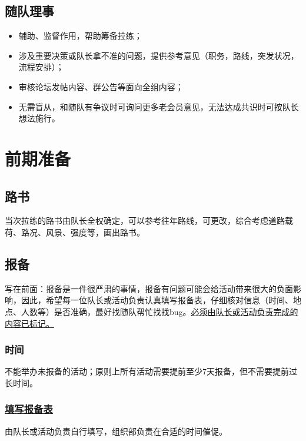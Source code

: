 \documentclass[UTF8]{ctexart}
\begin{document}
\subsection{随队理事}

\begin{itemize}[nosep,left=2em]
    \item 辅助、监督作用，帮助筹备拉练；
    \item 涉及重要决策或队长拿不准的问题，提供参考意见（职务，路线，突发状况，流程安排）；
    \item 审核论坛发帖内容、群公告等面向全组内容；
    \item 无需盲从，和随队有争议时可询问更多老会员意见，无法达成共识时可按队长想法施行。
    
\end{itemize}

\section{前期准备}

\subsection{路书}

当次拉练的路书由队长全权确定，可以参考往年路线，可更改，综合考虑道路载荷、路况、风景、强度等，画出路书。

\subsection{报备}

写在前面：报备是一件很严肃的事情，报备有问题可能会给活动带来很大的负面影响，因此，希望每一位队长或活动负责认真填写报备表，仔细核对信息（时间、地点、人数等）是否准确，最好找随队帮忙找找bug。\underline{必须由队长或活动负责完成的内容已标记。}

\subsubsection{时间}

不能举办未报备的活动；原则上所有活动需要提前至少7天报备，但不需要提前过长时间。

\subsubsection[填写报备表]{\underline{填写报备表}}

由队长或活动负责自行填写，组织部负责在合适的时间催促。
\end{document}
